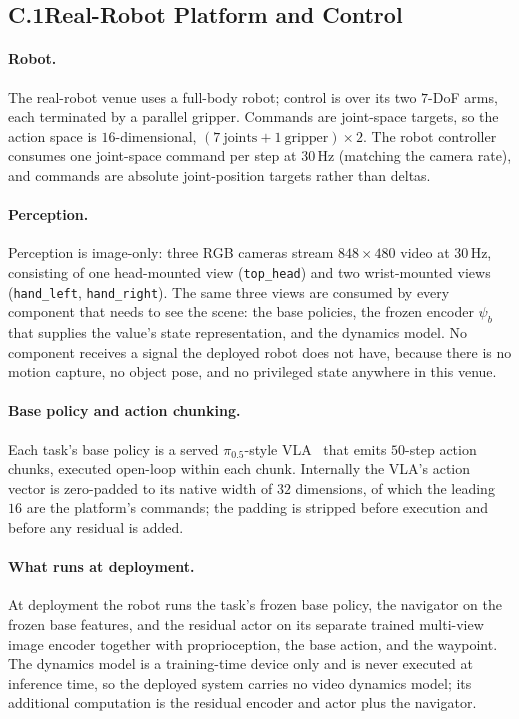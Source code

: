 \documentclass[letterpaper]{article} %
\begin{document}
\subsection{C.1\quad Real-Robot Platform and Control}

\paragraph{Robot.}
The real-robot venue uses a full-body robot; control is over its two
$7$-DoF arms, each terminated by a parallel gripper. Commands are joint-space targets,
so the action space is $16$-dimensional, $(7\ \text{joints} + 1\ \text{gripper}) \times 2$.
The robot controller consumes one joint-space command per step at $30$\,Hz (matching
the camera rate), and commands are absolute joint-position targets rather than deltas.

\paragraph{Perception.}
Perception is image-only: three RGB cameras stream $848{\times}480$ video at
$30$\,Hz, consisting of one head-mounted view (\texttt{top\_head}) and two wrist-mounted views
(\texttt{hand\_left}, \texttt{hand\_right}). The same three views are consumed by
every component that needs to see the scene: the base policies, the frozen
encoder $\psi_b$ that supplies the value's state representation, and the dynamics
model. No component receives a signal the deployed robot does not have, because there is
no motion capture, no object pose, and no privileged state anywhere in this
venue.

\paragraph{Base policy and action chunking.}
Each task's base policy is a served $\pi_{0.5}$-style
VLA~\cite{sima2026kai0,black2025pi05} that
emits $50$-step
action chunks, executed open-loop within each chunk. Internally the VLA's action
vector is zero-padded to its native width of $32$ dimensions, of which the
leading $16$ are the platform's commands; the padding is stripped before
execution and before any residual is added.

\paragraph{What runs at deployment.}
At deployment the robot runs the task's frozen base policy, the navigator on
the frozen base features, and the residual actor on its separate trained
multi-view image encoder together with proprioception, the base action, and the
waypoint. The dynamics model is a training-time device only and is never
executed at inference time, so the deployed system carries no video dynamics
model; its additional computation is the residual encoder and actor plus the
navigator.
\end{document}
